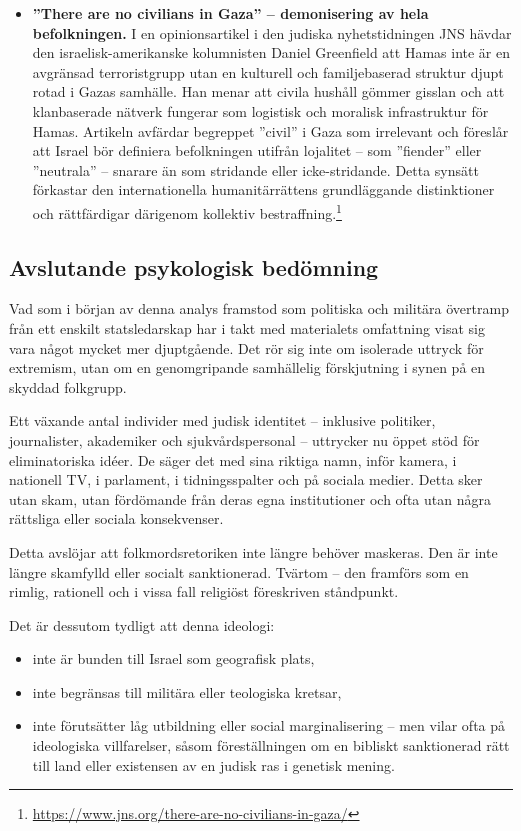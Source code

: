 \begin{itemize}
\item \textbf{”There are no civilians in Gaza” – demonisering av hela befolkningen.} I en opinionsartikel i den judiska nyhetstidningen JNS hävdar den israelisk-amerikanske kolumnisten Daniel Greenfield att Hamas inte är en avgränsad terroristgrupp utan en kulturell och familjebaserad struktur djupt rotad i Gazas samhälle. Han menar att civila hushåll gömmer gisslan och att klanbaserade nätverk fungerar som logistisk och moralisk infrastruktur för Hamas. Artikeln avfärdar begreppet ”civil” i Gaza som irrelevant och föreslår att Israel bör definiera befolkningen utifrån lojalitet – som ”fiender” eller ”neutrala” – snarare än som stridande eller icke-stridande. Detta synsätt förkastar den internationella humanitärrättens grundläggande distinktioner och rättfärdigar därigenom kollektiv bestraffning.\footnote{\url{https://www.jns.org/there-are-no-civilians-in-gaza/}}


\end{itemize}


\subsection{Avslutande psykologisk bedömning}

Vad som i början av denna analys framstod som politiska och militära övertramp från ett enskilt statsledarskap har i takt med materialets omfattning visat sig vara något mycket mer djuptgående. Det rör sig inte om isolerade uttryck för extremism, utan om en genomgripande samhällelig förskjutning i synen på en skyddad folkgrupp. 

Ett växande antal individer med judisk identitet – inklusive politiker, journalister, akademiker och sjukvårdspersonal – uttrycker nu öppet stöd för eliminatoriska idéer. De säger det med sina riktiga namn, inför kamera, i nationell TV, i parlament, i tidningsspalter och på sociala medier. Detta sker utan skam, utan fördömande från deras egna institutioner och ofta utan några rättsliga eller sociala konsekvenser.

Detta avslöjar att folkmordsretoriken inte längre behöver maskeras. Den är inte längre skamfylld eller socialt sanktionerad. Tvärtom – den framförs som en rimlig, rationell och i vissa fall religiöst föreskriven ståndpunkt.


Det är dessutom tydligt att denna ideologi:
\begin{itemize}
    \item inte är bunden till Israel som geografisk plats,
    \item inte begränsas till militära eller teologiska kretsar,
    \item inte förutsätter låg utbildning eller social marginalisering – men vilar ofta på ideologiska villfarelser, såsom föreställningen om en bibliskt sanktionerad rätt till land eller existensen av en judisk ras i genetisk mening.
\end{itemize}


